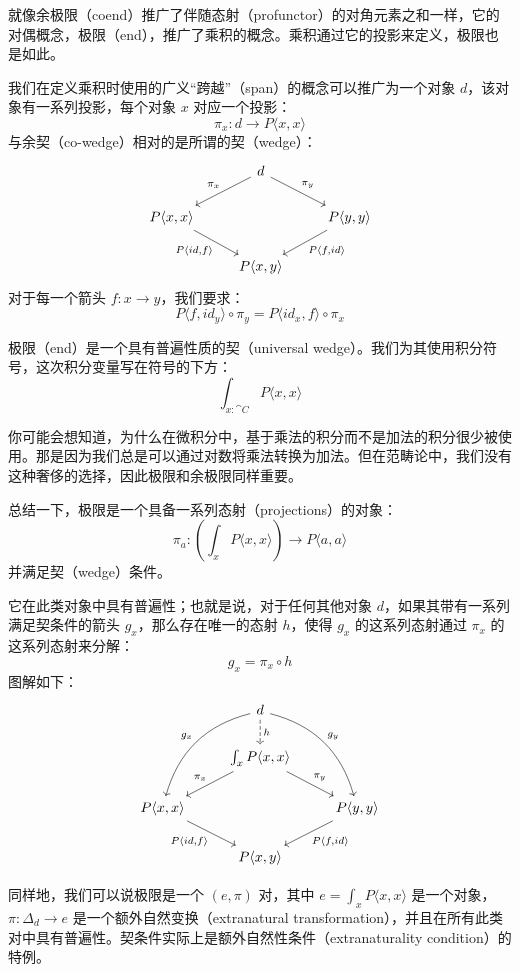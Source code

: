\documentclass[DaoFP]{subfiles}
\begin{document}
 就像余极限（coend）推广了伴随态射（profunctor）的对角元素之和一样，它的对偶概念，极限（end），推广了乘积的概念。乘积通过它的投影来定义，极限也是如此。

 我们在定义乘积时使用的广义“跨越”（span）的概念可以推广为一个对象 $d$，该对象有一系列投影，每个对象 $x$ 对应一个投影：
 \[ \pi_x \colon d \to P \langle x, x \rangle \]
 与余契（co-wedge）相对的是所谓的契（wedge）：
 \[
  \begin{tikzcd}
   &d
   \arrow[ld, "\pi_x"']
   \arrow[rd, "\pi_y"]
   \\
   P \langle x, x \rangle
   \arrow[dr, "{P \langle id, f \rangle}"']
   &&P \langle y, y \rangle
   \arrow[dl, "{P \langle f, id \rangle}"]
   \\
   & P \langle x, y \rangle
  \end{tikzcd}
 \]
 对于每一个箭头 $f \colon x \to y$，我们要求：
 \[ P \langle f, id_y \rangle \circ \pi_y = P \langle id_x, f \rangle \circ \pi_x \]

 极限（end）是一个具有普遍性质的契（universal wedge）。我们为其使用积分符号，这次积分变量写在符号的下方：
 \[ \int_{x \colon \cat C} P \langle x, x \rangle \]

 你可能会想知道，为什么在微积分中，基于乘法的积分而不是加法的积分很少被使用。那是因为我们总是可以通过对数将乘法转换为加法。但在范畴论中，我们没有这种奢侈的选择，因此极限和余极限同样重要。

 总结一下，极限是一个具备一系列态射（projections）的对象：
 \[ \pi_a \colon \left( \int_x P \langle x, x \rangle \right) \to P \langle a, a \rangle \]
 并满足契（wedge）条件。

 它在此类对象中具有普遍性；也就是说，对于任何其他对象 $d$，如果其带有一系列满足契条件的箭头 $g_x$，那么存在唯一的态射 $h$，使得 $g_x$ 的这系列态射通过 $\pi_x$ 的这系列态射来分解：
 \[ g_x = \pi_x \circ h \]
 图解如下：
 \[
  \begin{tikzcd}
   &d
   \arrow[ddl, bend right, "g_x"']
   \arrow[ddr, bend left, "g_y"]
   \arrow[d, dashed, "h"]
   \\
   & \int_x P \langle x, x \rangle
   \arrow[ld, "\pi_x"']
   \arrow[rd, "\pi_y"]
   \\
   P \langle x, x \rangle
   \arrow[dr, "{P \langle id, f \rangle}"']
   &&P \langle y, y \rangle
   \arrow[dl, "{P \langle f, id \rangle}"]
   \\
   & P \langle x, y \rangle
  \end{tikzcd}
 \]

 同样地，我们可以说极限是一个 $(e, \pi)$ 对，其中 $e = \int_x P\langle x, x\rangle$ 是一个对象，$\pi \colon \Delta_d \to e$ 是一个额外自然变换（extranatural transformation），并且在所有此类对中具有普遍性。契条件实际上是额外自然性条件（extranaturality condition）的特例。
\end{document}
